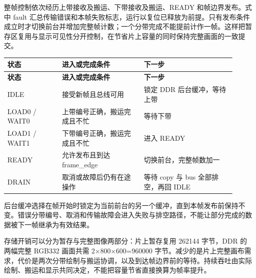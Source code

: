 \documentclass[UTF8,a4paper,12pt]{ctexart}
\begin{document}
整帧控制依次经历上带接收及搬运、下带接收及搬运、READY 和帧边界发布。式中 fault 汇总传输错误和本帧失败标志，运行以复位已释放为前提。只有发布条件成立时才切换前台并增加完整帧计数；一个分带完成不能提前计作一帧。这样把暂存区复用与显示可见性分开控制，在节省片上容量的同时保持完整画面的一致提交。\par

{\small\setlength{\tabcolsep}{4pt}\renewcommand{\arraystretch}{1.2}

\begin{longtable}{>{\raggedright\arraybackslash}p{0.22\linewidth}>{\raggedright\arraybackslash}p{0.33\linewidth}>{\raggedright\arraybackslash}p{0.37\linewidth}}

\toprule

\textbf{状态} & \textbf{进入或完成条件} & \textbf{下一步} \\ \midrule

\endfirsthead

\toprule

\textbf{状态} & \textbf{进入或完成条件} & \textbf{下一步} \\ \midrule

\endhead

IDLE & 接受新帧且总线可用 & 锁定 DDR 后台缓冲，等待上带 \\

LOAD0 / WAIT0 & 上带编号正确，搬运完成且不忙 & 等待下带 \\

LOAD1 / WAIT1 & 下带编号正确，搬运完成且不忙 & 进入 READY \\

READY & 允许发布且到达 frame\_edge & 切换前台，完整帧数加一 \\

DRAIN & 取消或故障后仍有在途操作 & 等待 copy 与 bus 全部排空，再回 IDLE \\

\bottomrule

\end{longtable}

}

后台缓冲选择在帧开始时锁定为当前前台的另一个缓冲，直到本帧发布前保持不变。错误分带编号、取消和传输故障会进入失败与排空路径，不能让部分完成的数据被下一帧继承为有效结果。\par

存储开销可以分为暂存与完整图像两部分：片上暂存复用 262144 字节，DDR 的两幅完整 RGB332 画面共需 2×800×600=960000 字节。减少的是片上完整画布需求，代价是两次分带绘制与搬运协调，以及到达帧边界前的等待。持续吞吐由实际绘制、搬运和显示共同决定，不能把容量节省直接换算为帧率提升。\par
\end{document}

